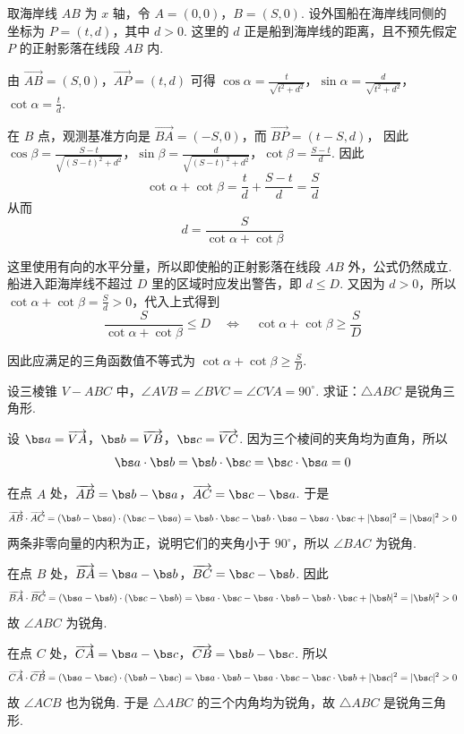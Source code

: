 \documentclass[UTF8,a4paper,oneside,11pt]{ctexbook}
\begin{document}
\begin{solution}
取海岸线 \(AB\) 为 \(x\) 轴，令
\(A=(0,0)\)，\(B=(S,0)\).
设外国船在海岸线同侧的坐标为 \(P=(t,d)\)，其中 \(d>0\).
这里的 \(d\) 正是船到海岸线的距离，且不预先假定 \(P\) 的正射影落在线段 \(AB\) 内.

由 \(\overrightarrow{AB}=(S,0)\)，\(\overrightarrow{AP}=(t,d)\) 可得
\(\cos\alpha=\frac{t}{\sqrt{t^2+d^2}}\)，\(\sin\alpha=\frac{d}{\sqrt{t^2+d^2}}\)，\(\cot\alpha=\frac{t}{d}\).

在 \(B\) 点，观测基准方向是 \(\overrightarrow{BA}=(-S,0)\)，而
\(
 \overrightarrow{BP}=(t-S,d)
\)，
因此
\(\cos\beta=\frac{S-t}{\sqrt{(S-t)^2+d^2}}\)，\(\sin\beta=\frac{d}{\sqrt{(S-t)^2+d^2}}\)，\(\cot\beta=\frac{S-t}{d}\).
因此
\[
\cot\alpha+\cot\beta
=\frac{t}{d}+\frac{S-t}{d}
=\frac{S}{d}
\]
从而
\[
d=\frac{S}{\cot\alpha+\cot\beta}
\]

这里使用有向的水平分量，所以即使船的正射影落在线段 \(AB\) 外，公式仍然成立. 船进入距海岸线不超过 \(D\) 里的区域时应发出警告，即 \(d\leq D\). 又因为 \(d>0\)，所以 \(\cot\alpha+\cot\beta=\frac{S}{d}>0\)，代入上式得到
\[
\frac{S}{\cot\alpha+\cot\beta}\leq D
\quad\Longleftrightarrow\quad
\cot\alpha+\cot\beta\geq\frac{S}{D}
\]

因此应满足的三角函数值不等式为
\(
\cot\alpha+\cot\beta\geq\frac{S}{D}
\).
\end{solution}

\begin{problem}
设三棱锥 \(V - ABC\) 中，\(\angle AVB = \angle BVC = \angle CVA = 90^{\circ}\). 求证：\(\triangle ABC\) 是锐角三角形.
\end{problem}

\begin{solution}
设 \(\bs a=\overrightarrow{VA}\)，\(\bs b=\overrightarrow{VB}\)，\(\bs c=\overrightarrow{VC}\).
因为三个棱间的夹角均为直角，所以
\[
\bs a\cdot\bs b=\bs b\cdot\bs c=\bs c\cdot\bs a=0
\]

在点 \(A\) 处，\(\overrightarrow{AB}=\bs b-\bs a\)，\(\overrightarrow{AC}=\bs c-\bs a\).
于是
\[
\overrightarrow{AB}\cdot\overrightarrow{AC}
=(\bs b-\bs a)\cdot(\bs c-\bs a)
=\bs b\cdot\bs c-\bs b\cdot\bs a-\bs a\cdot\bs c+\lvert\bs a\rvert^2
=\lvert\bs a\rvert^2>0
\]
两条非零向量的内积为正，说明它们的夹角小于 \(90^{\circ}\)，所以 \(\angle BAC\) 为锐角.

在点 \(B\) 处，\(\overrightarrow{BA}=\bs a-\bs b\)，\(\overrightarrow{BC}=\bs c-\bs b\).
因此
\[
\overrightarrow{BA}\cdot\overrightarrow{BC}
=(\bs a-\bs b)\cdot(\bs c-\bs b)
=\bs a\cdot\bs c-\bs a\cdot\bs b-\bs b\cdot\bs c+\lvert\bs b\rvert^2
=\lvert\bs b\rvert^2>0
\]
故 \(\angle ABC\) 为锐角.

在点 \(C\) 处，\(\overrightarrow{CA}=\bs a-\bs c\)，\(\overrightarrow{CB}=\bs b-\bs c\).
所以
\[
\overrightarrow{CA}\cdot\overrightarrow{CB}
=(\bs a-\bs c)\cdot(\bs b-\bs c)
=\bs a\cdot\bs b-\bs a\cdot\bs c-\bs c\cdot\bs b+\lvert\bs c\rvert^2
=\lvert\bs c\rvert^2>0
\]
故 \(\angle ACB\) 也为锐角. 于是 \(\triangle ABC\) 的三个内角均为锐角，故 \(\triangle ABC\) 是锐角三角形.
\end{solution}
\end{document}
